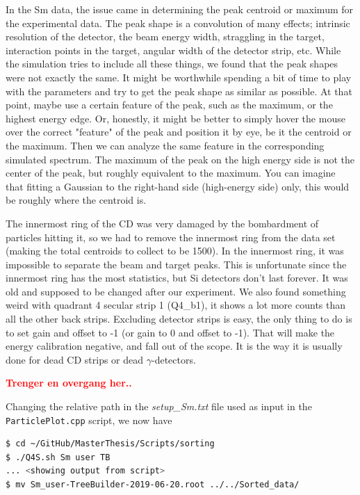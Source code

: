 \documentclass[twoside,english]{uiofysmaster/uiofysmaster}
\newcommand{\ga}{$\gamma$}
\begin{document}
In the Sm data, the issue came in determining the peak centroid or maximum for the experimental data. 
The peak shape is a convolution of many effects; intrinsic resolution of the detector, the beam energy width, straggling in the target, interaction points in the target, angular width of the detector strip, etc. 
While the simulation tries to include all these things, we found that the peak shapes were not exactly the same. 
It might be worthwhile spending a bit of time to play with the parameters and try to get the peak shape as similar as possible. 
At that point, maybe use a certain feature of the peak, such as the maximum, or the highest energy edge. 
Or, honestly, it might be better to simply hover the mouse over the correct "feature" of the peak and position it by eye, be it the centroid or the maximum.
Then we can analyze the same feature in the corresponding simulated spectrum.
The maximum of the peak on the high energy side is not the center of the peak, but roughly equivalent to the maximum. 
You can imagine that fitting a Gaussian to the right-hand side (high-energy side) only, this would be roughly where the centroid is. 

The innermost ring of the CD was very damaged by the bombardment of particles hitting it, so we had to remove the innermost ring from the data set (making the total centroids to collect to be 1500). 
In the innermost ring, it was impossible to separate the beam and target peaks.
This is unfortunate since the innermost ring has the most statistics, but Si detectors don't last forever. 
It was old and supposed to be changed after our experiment. 
We also found something weird with quadrant 4 secular strip 1 (Q4\_b1), it shows a lot more counts than all the other back strips. 
Excluding detector strips is easy, the only thing to do is to set gain and offset to -1 (or gain to 0 and offset to -1). 
That will make the energy calibration negative, and fall out of the scope. 
It is the way it is usually done for dead CD strips or dead \ga-detectors. 

\bigskip

\textcolor{red}{\textbf{Trenger en overgang her..}}

\bigskip

Changing the relative path in the \textit{setup\_Sm.txt} file used as input in the \texttt{ParticlePlot.cpp} script, we now have


\begin{lstlisting}[language=sh]
$ cd ~/GitHub/MasterThesis/Scripts/sorting 
$ ./Q4S.sh Sm user TB
... <showing output from script>
$ mv Sm_user-TreeBuilder-2019-06-20.root ../../Sorted_data/
\end{lstlisting}
\end{document}
